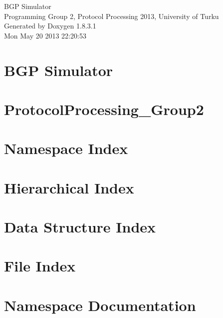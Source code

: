 \documentclass{book}
\begin{document}
\hypersetup{pageanchor=false,citecolor=blue}
\begin{titlepage}
\vspace*{7cm}
\begin{center}
{\Large B\-G\-P Simulator \\[1ex]\large Programming Group 2, Protocol Processing 2013, University of Turku }\\
\vspace*{1cm}
{\large Generated by Doxygen 1.8.3.1}\\
\vspace*{0.5cm}
{\small Mon May 20 2013 22:20:53}\\
\end{center}
\end{titlepage}
\clearemptydoublepage
{}
\tableofcontents
\clearemptydoublepage
{}
\hypersetup{pageanchor=true,citecolor=blue}
\chapter{B\-G\-P Simulator}
\label{index}\hypertarget{index}{}
\chapter{Protocol\-Processing\-\_\-\-Group2}
\label{md_README}
\hypertarget{md_README}{}

\chapter{Namespace Index}

\chapter{Hierarchical Index}

\chapter{Data Structure Index}

\chapter{File Index}

\chapter{Namespace Documentation}


\end{document}
